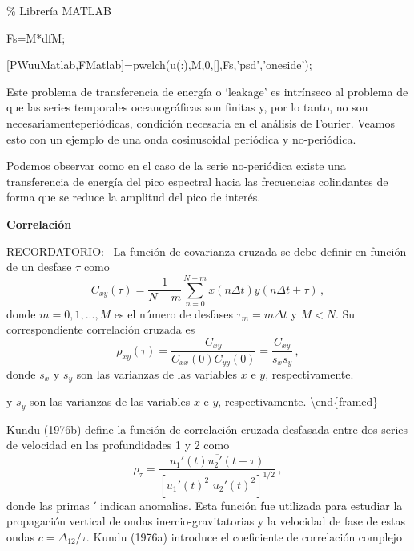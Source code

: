\documentclass[
]{agujournal2019}
\begin{document}
\begin{framed}

\% Librería MATLAB\

Fs=M*dfM;\

[PWuuMatlab,FMatlab]=pwelch(u(:),M,0,[],Fs,'psd','oneside');\

\end{framed}

Este problema de transferencia de energía o `leakage' es intrínseco al
problema de que las series temporales oceanográficas son finitas y, por
lo tanto, no son necesariamenteperiódicas, condición necesaria en el
análisis de Fourier. Veamos esto con un ejemplo de una onda cosinusoidal
periódica y no-periódica.

\begin{center}
\end{center}

Podemos observar como en el caso de la serie no-periódica existe una
transferencia de energía del pico espectral hacia las frecuencias
colindantes de forma que se reduce la amplitud del pico de interés.

\vspace{0.25cm}

\textbf{Correlación}

\begin{framed}
{\rm RECORDATORIO:}
\
La función de covarianza cruzada se debe definir en función de un desfase $\tau$ como
 $$C_{xy}(\tau)=\frac{1}{N-m}\sum\limits^{N-m}_{n=0}x(n\Delta t) y(n\Delta t +\tau)\,,$$
donde $m=0,1,...,M$ es el número de desfases $\tau_m=m\Delta t$ y $M<N$.
Su correspondiente correlación cruzada es
  $${\rho}_{xy}(\tau)=\frac{C_{xy}}{C_{xx}(0)C_{yy}(0)}=\frac{C_{xy}}{s_{x}s_{y}}\,,$$
donde $s_x$ y $s_y$ son las varianzas de las variables $x$ e $y$, respectivamente.
\end{framed}

y \(s_y\) son las varianzas de las variables \(x\) e \(y\),
respectivamente. \textbackslash end\{framed\}

Kundu (1976b) define la función de correlación cruzada desfasada entre
dos series de velocidad en las profundidades 1 y 2 como
\[\rho_{\tau}=\frac{\overline{u_1'(t)u_2'(t-\tau)}}
{\left[ \overline{u_1'(t)^2}\,\, \overline{u_2'(t)^2} \right]^{1/2}}\,,\]
donde las primas \('\) indican anomalias. Esta función fue utilizada
para estudiar la propagación vertical de ondas inercio-gravitatorias y
la velocidad de fase de estas ondas \(c=\Delta_{12}/\tau\). Kundu
(1976a) introduce el coeficiente de correlación complejo
\end{document}
